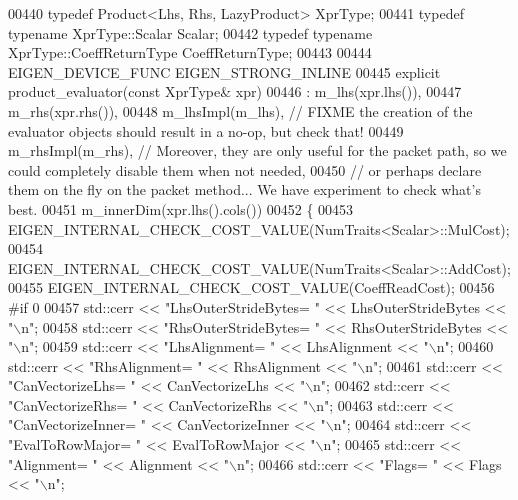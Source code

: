 \begin{DoxyCode}
00440   \textcolor{keyword}{typedef} Product<Lhs, Rhs, LazyProduct> XprType;
00441   \textcolor{keyword}{typedef} \textcolor{keyword}{typename} XprType::Scalar Scalar;
00442   \textcolor{keyword}{typedef} \textcolor{keyword}{typename} XprType::CoeffReturnType CoeffReturnType;
00443 
00444   EIGEN\_DEVICE\_FUNC EIGEN\_STRONG\_INLINE
00445   \textcolor{keyword}{explicit} product\_evaluator(\textcolor{keyword}{const} XprType& xpr)
00446     : m\_lhs(xpr.lhs()),
00447       m\_rhs(xpr.rhs()),
00448       m\_lhsImpl(m\_lhs),     \textcolor{comment}{// FIXME the creation of the evaluator objects should result in a no-op, but
       check that!}
00449       m\_rhsImpl(m\_rhs),     \textcolor{comment}{//       Moreover, they are only useful for the packet path, so we could
       completely disable them when not needed,}
00450                             \textcolor{comment}{//       or perhaps declare them on the fly on the packet method... We have
       experiment to check what's best.}
00451       m\_innerDim(xpr.lhs().cols())
00452   \{
00453     EIGEN\_INTERNAL\_CHECK\_COST\_VALUE(NumTraits<Scalar>::MulCost);
00454     EIGEN\_INTERNAL\_CHECK\_COST\_VALUE(NumTraits<Scalar>::AddCost);
00455     EIGEN\_INTERNAL\_CHECK\_COST\_VALUE(CoeffReadCost);
00456 \textcolor{preprocessor}{#if 0}
00457     std::cerr << \textcolor{stringliteral}{"LhsOuterStrideBytes=  "} << LhsOuterStrideBytes << \textcolor{stringliteral}{"\(\backslash\)n"};
00458     std::cerr << \textcolor{stringliteral}{"RhsOuterStrideBytes=  "} << RhsOuterStrideBytes << \textcolor{stringliteral}{"\(\backslash\)n"};
00459     std::cerr << \textcolor{stringliteral}{"LhsAlignment=         "} << LhsAlignment << \textcolor{stringliteral}{"\(\backslash\)n"};
00460     std::cerr << \textcolor{stringliteral}{"RhsAlignment=         "} << RhsAlignment << \textcolor{stringliteral}{"\(\backslash\)n"};
00461     std::cerr << \textcolor{stringliteral}{"CanVectorizeLhs=      "} << CanVectorizeLhs << \textcolor{stringliteral}{"\(\backslash\)n"};
00462     std::cerr << \textcolor{stringliteral}{"CanVectorizeRhs=      "} << CanVectorizeRhs << \textcolor{stringliteral}{"\(\backslash\)n"};
00463     std::cerr << \textcolor{stringliteral}{"CanVectorizeInner=    "} << CanVectorizeInner << \textcolor{stringliteral}{"\(\backslash\)n"};
00464     std::cerr << \textcolor{stringliteral}{"EvalToRowMajor=       "} << EvalToRowMajor << \textcolor{stringliteral}{"\(\backslash\)n"};
00465     std::cerr << \textcolor{stringliteral}{"Alignment=            "} << Alignment << \textcolor{stringliteral}{"\(\backslash\)n"};
00466     std::cerr << \textcolor{stringliteral}{"Flags=                "} << Flags << \textcolor{stringliteral}{"\(\backslash\)n"};

\end{DoxyCode}

